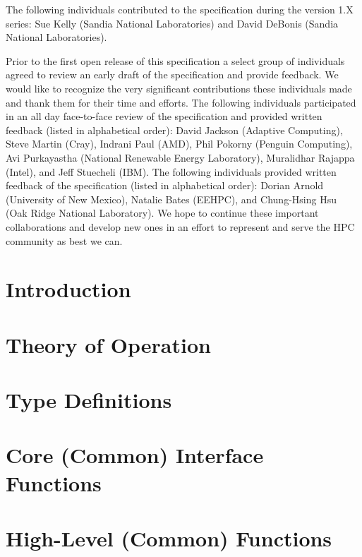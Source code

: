 \documentclass[12pt]{report}
\begin{document}
The following individuals contributed to the specification during the version 1.X series: Sue Kelly (Sandia National Laboratories) and David DeBonis (Sandia National Laboratories). 

Prior to the first open release of this specification a select group of individuals agreed to review an early draft of the specification and provide feedback. 
We would like to recognize the very significant contributions these individuals made and thank them for their time and efforts. 
The following individuals participated in an all day face-to-face review of the specification and provided written feedback (listed in alphabetical order): David Jackson (Adaptive Computing), Steve Martin (Cray), Indrani Paul (AMD), Phil Pokorny (Penguin Computing), Avi Purkayastha (National Renewable Energy Laboratory), Muralidhar Rajappa (Intel), and Jeff Stuecheli (IBM).
The following individuals provided written feedback of the specification (listed in alphabetical order): Dorian Arnold (University of New Mexico), Natalie Bates (EEHPC), and Chung-Hsing Hsu (Oak Ridge National Laboratory).
We hope to continue these important collaborations and develop new ones in an effort to represent and serve the HPC community as best we can.



	\tableofcontents

	\chapter{Introduction}						%
	

	\chapter{Theory of Operation}\label{chap:Theory}
	

	\chapter{Type Definitions}\label{chap:TypeDefinitions}
	

	\chapter{Core (Common) Interface Functions}\label{chap:Common}
	
      
	\chapter{High-Level (Common) Functions}\label{chap:HighLevel}
	
\end{document}
